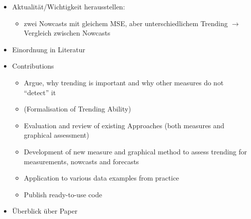 
\begin{itemize}
    \item Aktualität/Wichtigkeit herausstellen: 
    \begin{itemize}
        \item zwei Nowcasts mit gleichem MSE, aber unterschiedlichem Trending $\rightarrow$ Vergleich zwischen Nowcasts
    \end{itemize}
    \item Einordnung in Literatur
    \item Contributions
    \begin{itemize}
        \item Argue, why trending is important and why other measures do not \enquote{detect} it
        \item (Formalisation of Trending Ability)
        \item Evaluation and review of existing Approaches (both measures and graphical assessment)
        \item Development of new measure and graphical method to assess trending for measurements, nowcasts and forecasts
        \item Application to various data examples from practice
        \item Publish ready-to-use code
    \end{itemize}
    \item Überblick über Paper
\end{itemize}
